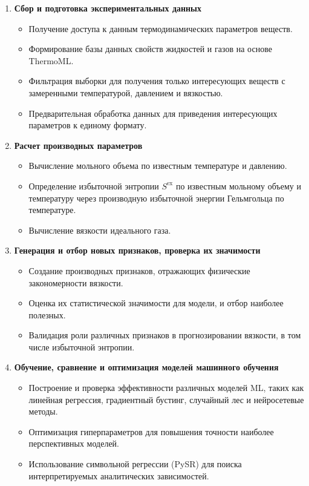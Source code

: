 \documentclass[a4paper,12pt]{article}
\begin{document}
    \begin{enumerate}
      \item \textbf{Сбор и подготовка экспериментальных данных}{
        \begin{itemize}
          \item Получение доступа к данным термодинамических параметров веществ.
          \item Формирование базы данных свойств жидкостей и газов на основе ThermoML.
          \item Фильтрация выборки для получения только интересующих веществ с замеренными температурой, давлением и вязкостью.
          \item Предварительная обработка данных для приведения интересующих параметров к единому формату.
        \end{itemize}
      }
    
        \item \textbf{Расчет производных параметров}
        \begin{itemize}
            \item Вычисление мольного объема по известным температуре и давлению.
            \item Определение избыточной энтропии $S^{\text{ex}}$ по известным мольному объему и температуру через производную избыточной энергии Гельмгольца по температуре.
            \item Вычисление вязкости идеального газа.
        \end{itemize}
    
        \item \textbf{Генерация и отбор новых признаков, проверка их значимости}
        \begin{itemize}
            \item Создание производных признаков, отражающих физические закономерности вязкости.
            \item Оценка их статистической значимости для модели, и отбор наиболее полезных.
            \item Валидация роли различных признаков в прогнозировании вязкости, в том числе избыточной энтропии.
        \end{itemize}
    
        \item \textbf{Обучение, сравнение и оптимизация моделей машинного обучения}
        \begin{itemize}
            \item Построение и проверка эффективности различных моделей ML, таких как линейная регрессия, градиентный бустинг, случайный лес и нейросетевые методы.
            \item Оптимизация гиперпараметров для повышения точности наиболее перспективных моделей.
            \item Использование символьной регрессии (PySR) для поиска интерпретируемых аналитических зависимостей.
        \end{itemize}
    

\end{enumerate}
\end{document}
